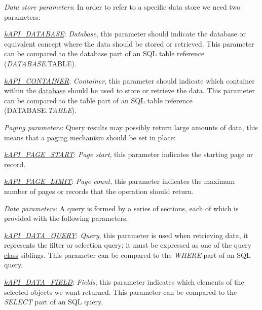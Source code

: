 \begin{DoxyItemize}
\item {\itshape Data store parameters}\-: In order to refer to a specific data store we need two parameters\-: 
\begin{DoxyItemize}
\item {\itshape \hyperlink{}{k\-A\-P\-I\-\_\-\-D\-A\-T\-A\-B\-A\-S\-E}}\-: {\itshape Database}, this parameter should indicate the database or equivalent concept where the data should be stored or retrieved. This parameter can be compared to the database part of an S\-Q\-L table reference ({\itshape D\-A\-T\-A\-B\-A\-S\-E}.T\-A\-B\-L\-E). 
\item {\itshape \hyperlink{}{k\-A\-P\-I\-\_\-\-C\-O\-N\-T\-A\-I\-N\-E\-R}}\-: {\itshape Container}, this parameter should indicate which container within the \hyperlink{}{database} should be used to store or retrieve the data. This parameter can be compared to the table part of an S\-Q\-L table reference (D\-A\-T\-A\-B\-A\-S\-E.{\itshape T\-A\-B\-L\-E}). 
\end{DoxyItemize}
\item {\itshape Paging parameters}\-: Query results may possibly return large amounts of data, this means that a paging mechanism should be set in place\-: 
\begin{DoxyItemize}
\item {\itshape \hyperlink{}{k\-A\-P\-I\-\_\-\-P\-A\-G\-E\-\_\-\-S\-T\-A\-R\-T}}\-: {\itshape Page start}, this parameter indicates the starting page or record. 
\item {\itshape \hyperlink{}{k\-A\-P\-I\-\_\-\-P\-A\-G\-E\-\_\-\-L\-I\-M\-I\-T}}\-: {\itshape Page count}, this parameter indicates the maximum number of pages or records that the operation should return. 
\end{DoxyItemize}
\item {\itshape Data parameters}\-: A query is formed by a series of sections, each of which is provided with the following parameters\-: 
\begin{DoxyItemize}
\item {\itshape \hyperlink{}{k\-A\-P\-I\-\_\-\-D\-A\-T\-A\-\_\-\-Q\-U\-E\-R\-Y}}\-: {\itshape Query}, this parameter is used when retrieving data, it represents the filter or selection query; it must be expressed as one of the query \hyperlink{class_c_query}{class} siblings. This parameter can be compared to the {\itshape W\-H\-E\-R\-E} part of an S\-Q\-L query. 
\item {\itshape \hyperlink{}{k\-A\-P\-I\-\_\-\-D\-A\-T\-A\-\_\-\-F\-I\-E\-L\-D}}\-: {\itshape Fields}, this parameter indicates which elements of the selected objects we want returned. This parameter can be compared to the {\itshape S\-E\-L\-E\-C\-T} part of an S\-Q\-L query. 

\end{DoxyItemize}
\end{DoxyItemize}
